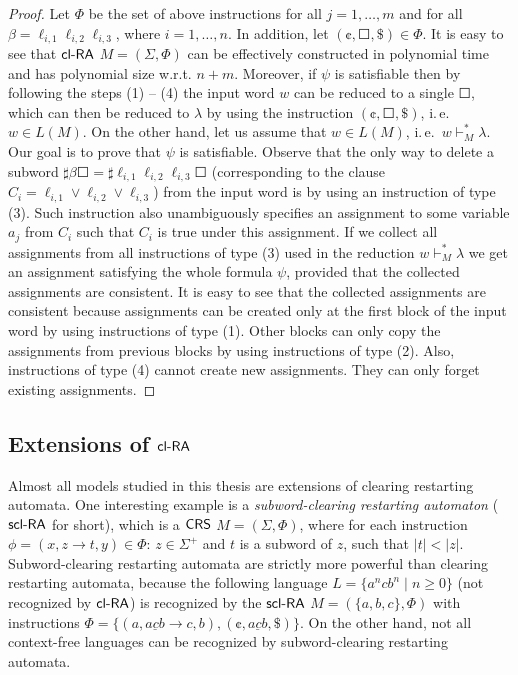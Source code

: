 \begin{proof}
Let $\Phi$ be the set of above instructions for all $j = 1, \ldots, m$ and for all $\beta = \ell_{i,1} \ell_{i,2} \ell_{i,3}$, where $i = 1, \ldots, n$. In addition, let $(\cent, \Square, \$) \in \Phi$. It is easy to see that $\textup{\sf cl-RA\/}$ $M = (\Sigma, \Phi)$ can be effectively constructed in polynomial time and has polynomial size w.r.t. $n + m$. Moreover, if $\psi$ is satisfiable then by following the steps (1) -- (4) the input word $w$ can be reduced to a single $\Square$, which can then be reduced to $\lambda$ by using the instruction $(\cent, \Square, \$)$, i.\,e.\ $w \in L(M)$. On the other hand, let us assume that $w \in L(M)$, i.\,e.\ $w \vdash_M^* \lambda$. Our goal is to prove that $\psi$ is satisfiable. Observe that the only way to delete a subword $\sharp \beta \Square = \sharp \ell_{i,1} \ell_{i,2} \ell_{i,3} \Square$ (corresponding to the clause $C_i = \ell_{i,1} \vee \ell_{i,2} \vee \ell_{i,3}$) from the input word is by using an instruction of type (3). Such instruction also unambiguously specifies an assignment to some variable $a_j$ from $C_i$ such that $C_i$ is true under this assignment. If we collect all assignments from all instructions of type (3) used in the reduction $w \vdash_M^* \lambda$ we get an assignment satisfying the whole formula $\psi$, provided that the collected assignments are consistent. It is easy to see that the collected assignments are consistent because assignments can be created only at the first block of the input word by using instructions of type (1). Other blocks can only copy the assignments from previous blocks by using instructions of type (2). Also, instructions of type (4) cannot create new assignments. They can only forget existing assignments.
\end{proof}

\subsection{Extensions of $\textup{\sf cl-RA\/}$}\label{clra_extensions}

Almost all models studied in this thesis are extensions of clearing restarting automata. One interesting example is a \emph{subword-clearing restarting automaton} (\emph{$\textup{\sf scl-RA}$} for short), which is a $\textup{\sf CRS\/}$ $M = (\Sigma, \Phi)$, where for each instruction  $\phi = (x, z \to t, y) \in \Phi$: $z \in \Sigma^+$ and $t$ is a subword of $z$, such that $|t| < |z|$. Subword-clearing restarting automata are strictly more powerful than clearing restarting automata, because the following language $L = \{a^n c b^n \mid n \ge 0\}$ (not recognized by $\textup{\sf cl-RA\/}$) is recognized by the $\textup{\sf scl-RA}$ $M = (\{a, b, c\}, \Phi)$ with instructions $\Phi = \{(a, \underline{acb} \to c, b), (\cent, \underline{acb}, \$)\}$. On the other hand, not all context-free languages can be recognized by subword-clearing restarting automata. 

